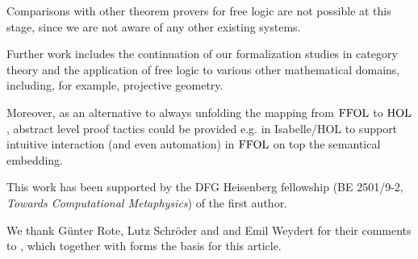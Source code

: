 

Comparisons with other theorem provers for free logic are not possible at this stage, since we are not aware of any other existing systems.

Further work includes the continuation of our formalization studies in
category theory and the application of free logic to various other
mathematical domains, including, for example,  projective geometry.

Moreover, as an alternative to always unfolding the mapping from
$\text{\textrm{FFOL}}$ to $\text{\textrm{HOL}}$, abstract level proof tactics could be provided
e.g. in Isabelle/HOL to support intuitive interaction (and even
automation) in $\text{\textrm{FFOL}}$ on top the semantical embedding.

\begin{acknowledgements}
This work has been supported by the DFG Heisenberg fellowship (BE
2501/9-2, \emph{Towards Computational Metaphysics}) of the first
author.

We thank G{\"u}nter Rote, Lutz Schr\"oder and and Emil Weydert for their
comments to \cite{ArXiv}, which together with \cite{ICMS} forms the
basis for this article.

\end{acknowledgements}





